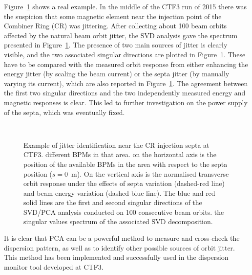 Figure~\ref{fig:septaJitterAnalysis} shows a real example.
In the middle of the CTF3 run of 2015 there was the suspicion that some magnetic element
near the injection point of the Combiner Ring (CR) was jittering.
After collecting about 100 beam orbits affected by the natural beam orbit jitter, the
SVD analysis gave the spectrum presented in
Figure~\ref{fig:septaJitterAnalysis}.
The presence of two main sources of jitter is clearly visible, and the two associated
singular directions are plotted in
Figure~\ref{fig:septaJitterAnalysis}.
These have to be compared with the measured orbit response from either enhancing the
energy jitter (by scaling the beam current) or the septa jitter (by manually varying its
current), which are also reported in
Figure~\ref{fig:septaJitterAnalysis}.
The agreement between the first two singular directions and the two independently
measured energy and magnetic responses is clear.
This led to further investigation on the power supply of the septa, which was eventually
fixed.
%
\begin{figure}[h!]
\centering
{}
\\%
{}
\caption{Example of jitter identification near the CR injection septa at CTF3.
different BPMs in that area.
\protect{} on the horizontal axis is the position
of the available BPMs in the area with respect to the septa position ($s = 0$~m).
On the vertical axis is the normalised transverse orbit response under the effects of
septa variation (dashed-red line) and beam-energy variation (dashed-blue line).
The blue and red solid lines are the first and second singular directions of the SVD/PCA
analysis conducted on 100 consecutive beam orbits. 
\protect{} the singular values spectrum of the
associated SVD decomposition.}
\label{fig:septaJitterAnalysis}
\end{figure}
%

It is clear that PCA can be a powerful method to measure and cross-check the dispersion
pattern,
as well as to identify other possible sources of orbit jitter.
This method has been implemented and successfully used in the dispersion monitor tool
developed at CTF3.


